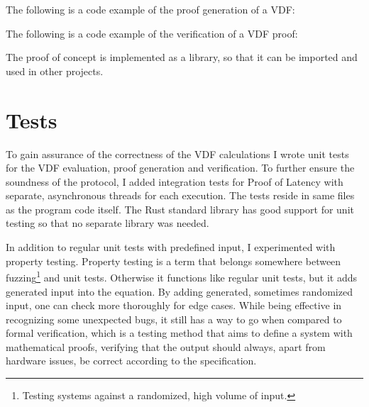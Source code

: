 The following is a code example of the proof generation of a VDF:

The following is a code example of the verification of a VDF proof:

The proof of concept is implemented as a library, so that it can be imported and used in other projects.


\section{Tests}
To gain assurance of the correctness of the VDF calculations I wrote unit tests for the VDF evaluation, proof generation and verification. To further ensure the soundness of the protocol, I added integration tests for Proof of Latency with separate, asynchronous threads for each execution. The tests reside in same files as the program code itself. The Rust standard library has good support for unit testing so that no separate library was needed.

In addition to regular unit tests with predefined input, I experimented with property testing. Property testing is a term that belongs somewhere between fuzzing\footnote{Testing systems against a randomized, high volume of input.} and unit tests. Otherwise it functions like regular unit tests, but it adds generated input into the equation. By adding generated, sometimes randomized input, one can check more thoroughly for edge cases. While being effective in recognizing some unexpected bugs, it still has a way to go when compared to formal verification, which is a testing method that aims to define a system with mathematical proofs, verifying that the output should always, apart from hardware issues, be correct according to the specification.

